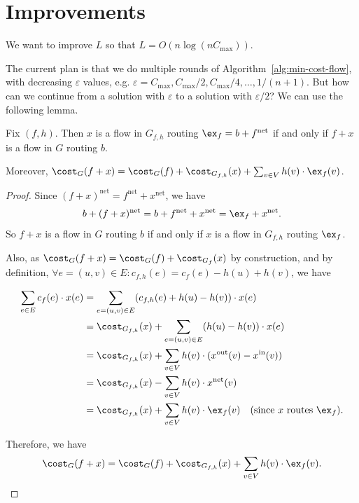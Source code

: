 \section{Improvements}

We want to improve $L$ so that $L = O(n\log (nC_{\max}))$.

The current plan is that we do multiple rounds of Algorithm~\ref{alg:min-cost-flow}, with decreasing $\varepsilon$ values, e.g. $\varepsilon = C_{\max}, C_{\max}/2, C_{\max}/4, \ldots, 1/(n+1)$.
But how can we continue from a solution with $\varepsilon$ to a solution with $\varepsilon/2$? We can use the following lemma.

\begin{lemma}
	Fix $(f,h)$.
	Then $x$ is a flow in $G_{f,h}$ routing $\ex_f = b+f^{\text{net}}$ if and only if $f+x$ is a flow in $G$ routing $b$.

	Moreover, $\cost_G(f+x) = \cost_{G}(f) + \cost_{G_{f,h}}(x) + \sum_{v \in V} h(v) \cdot \ex_f(v)$.
\end{lemma}
\begin{proof}
	Since $(f+x)^{\text{net}} = f^{\text{net}} + x^{\text{net}}$, we have
	\[ b+(f+x)^{\text{net}} = b+f^{\text{net}} + x^{\text{net}} = \ex_f + x^{\text{net}}. \]
	So $f+x$ is a flow in $G$ routing $b$ if and only if $x$ is a flow in $G_{f,h}$ routing $\ex_f$.

	Also, as $ \cost_G(f+x) = \cost_G(f)+\cost_{G_f}(x) $ by construction, and by definition, $\forall e = (u,v) \in E: c_{f,h}(e) = c_f(e) - h(u) + h(v)$, we have

	\begin{align*}
		\sum_{e \in E} c_f(e) \cdot x(e) & = \sum_{e = (u,v) \in E} (c_{f,h}(e) + h(u) - h(v)) \cdot x(e)                                    \\
		                                 & = \cost_{G_{f,h}}(x) + \sum_{e=(u,v) \in E} (h(u) - h(v)) \cdot x(e)                              \\
		                                 & = \cost_{G_{f,h}}(x) + \sum_{v \in V} h(v) \cdot (x^{\text{out}}(v) - x^{\text{in}}(v))           \\
		                                 & = \cost_{G_{f,h}}(x) - \sum_{v\in V} h(v) \cdot x^{\text{net}}(v)                                 \\
		                                 & = \cost_{G_{f,h}}(x) + \sum_{v\in V} h(v) \cdot \ex_f(v) \quad \text{(since $x$ routes $\ex_f$).}
	\end{align*}

	Therefore, we have
	\[ \cost_G(f+x) = \cost_G(f) + \cost_{G_{f,h}}(x) + \sum_{v\in V} h(v) \cdot \ex_f(v). \]
\end{proof}

